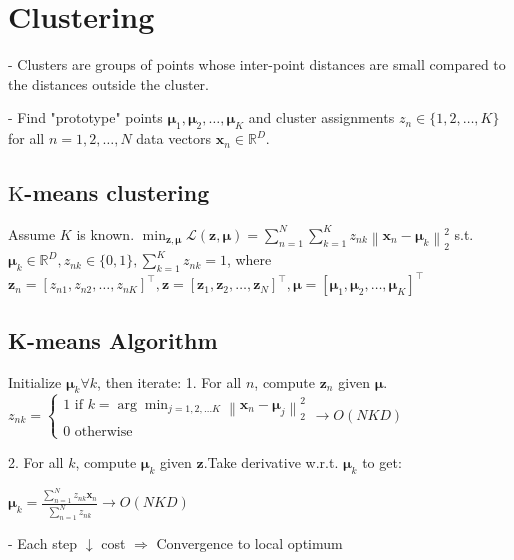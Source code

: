 
\section{Clustering}
- Clusters are groups of points whose inter-point distances are small compared to the distances outside the cluster.

- Find "prototype" points $\boldsymbol{\mu}_{1}, \boldsymbol{\mu}_{2}, \ldots, \boldsymbol{\mu}_{K}$ and cluster assignments $z_{n} \in\{1,2, \ldots, K\}$ for all $n=1,2, \ldots, N$ data vectors $\mathbf{x}_{n} \in \mathbb{R}^{D}$.

\subsection*{$\mathrm{K}$-means clustering}
Assume $K$ is known.
$
\min _{\mathbf{z}, \boldsymbol{\mu}} \mathcal{L}(\mathbf{z}, \boldsymbol{\mu})=\sum_{n=1}^{N} \sum_{k=1}^{K} z_{n k}\left\|\mathbf{x}_{n}-\boldsymbol{\mu}_{k}\right\|_{2}^{2}
$
s.t. $\boldsymbol{\mu}_{k} \in \mathbb{R}^{D}, z_{n k} \in\{0,1\}, \sum_{k=1}^{K} z_{n k}=1$,
where $\mathbf{z}_{n}=\left[z_{n 1}, z_{n 2}, \ldots, z_{n K}\right]^{\top},
\mathbf{z} =\left[\mathbf{z}_{1}, \mathbf{z}_{2}, \ldots, \mathbf{z}_{N}\right]^{\top},
\boldsymbol{\mu} =\left[\boldsymbol{\mu}_{1}, \boldsymbol{\mu}_{2}, \ldots, \boldsymbol{\mu}_{K}\right]^{\top}
$

\subsection*{K-means Algorithm}

Initialize $\boldsymbol{\mu}_{k} \forall k$, then iterate:
1. For all $n$, compute $\mathbf{z}_{n}$ given $\boldsymbol{\mu}$.
  $z_{n k}=\left\{\begin{array}{l}1 \text { if } k=\arg \min _{j=1,2, \ldots K}\left\|\mathbf{x}_{n}-\boldsymbol{\mu}_{j}\right\|_{2}^{2} \\ 0 \text { otherwise }\end{array}\right.\rightarrow O(NKD)$

2. For all $k$, compute $\boldsymbol{\mu}_{k}$ given $\mathbf{z}$.Take derivative w.r.t. $\boldsymbol{\mu}_{k}$ to get:
  
  $
  \boldsymbol{\mu}_{k}=\frac{\sum_{n=1}^{N} z_{n k} \mathbf{x}_{n}}{\sum_{n=1}^{N} z_{n k}}
  \rightarrow O(NKD)$



- Each step $\downarrow$ cost $\Rightarrow$ Convergence to local optimum

